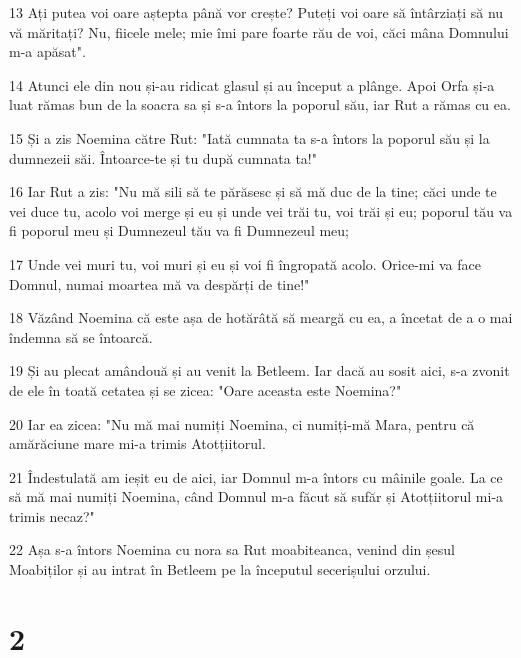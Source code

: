 \par 13 Ați putea voi oare aștepta până vor crește? Puteți voi oare să întârziați să nu vă măritați? Nu, fiicele mele; mie îmi pare foarte rău de voi, căci mâna Domnului m-a apăsat".
\par 14 Atunci ele din nou și-au ridicat glasul și au început a plânge. Apoi Orfa și-a luat rămas bun de la soacra sa și s-a întors la poporul său, iar Rut a rămas cu ea.
\par 15 Și a zis Noemina către Rut: "Iată cumnata ta s-a întors la poporul său și la dumnezeii săi. Întoarce-te și tu după cumnata ta!"
\par 16 Iar Rut a zis: "Nu mă sili să te părăsesc și să mă duc de la tine; căci unde te vei duce tu, acolo voi merge și eu și unde vei trăi tu, voi trăi și eu; poporul tău va fi poporul meu și Dumnezeul tău va fi Dumnezeul meu;
\par 17 Unde vei muri tu, voi muri și eu și voi fi îngropată acolo. Orice-mi va face Domnul, numai moartea mă va despărți de tine!"
\par 18 Văzând Noemina că este așa de hotărâtă să meargă cu ea, a încetat de a o mai îndemna să se întoarcă.
\par 19 Și au plecat amândouă și au venit la Betleem. Iar dacă au sosit aici, s-a zvonit de ele în toată cetatea și se zicea: "Oare aceasta este Noemina?"
\par 20 Iar ea zicea: "Nu mă mai numiți Noemina, ci numiți-mă Mara, pentru că amărăciune mare mi-a trimis Atotțiitorul.
\par 21 Îndestulată am ieșit eu de aici, iar Domnul m-a întors cu mâinile goale. La ce să mă mai numiți Noemina, când Domnul m-a făcut să sufăr și Atotțiitorul mi-a trimis necaz?"
\par 22 Așa s-a întors Noemina cu nora sa Rut moabiteanca, venind din șesul Moabiților și au intrat în Betleem pe la începutul secerișului orzului.

\chapter{2}

